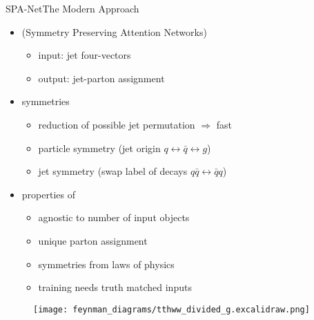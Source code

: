 \documentclass[9pt, aspectratio=169]{beamer}
\begin{document}
\begin{frame}{SPA-Net}{The Modern Approach}
	\begin{minipage}{.58\textwidth}
		\begin{itemize}
			\item \spanet (Symmetry Preserving Attention Networks)
			\begin{itemize}
				\item input: jet four-vectors
				\item output: jet-parton assignment
			\end{itemize}
			\item symmetries
			\begin{itemize}
				\item reduction of possible jet permutation $\Rightarrow$ fast
				\item particle symmetry (jet origin $q\leftrightarrow \bar{q}\leftrightarrow g$)
				\item jet symmetry (swap label of decays $q\bar{q}\leftrightarrow\bar{q}q$)
			\end{itemize}
			\item properties of \spanet
			\begin{itemize}
				\item agnostic to number of input objects
				\item unique parton assignment
				\item symmetries from laws of physics 
				\item training needs truth matched inputs
			\end{itemize}
		\end{itemize}
	  \end{minipage}\hfill
	  \begin{minipage}{.4\textwidth}
		  \begin{figure}
			  \centering
			  \texttt{[image: feynman\_diagrams/tthww\_divided\_g.excalidraw.png]}	
		  \end{figure}
	  \end{minipage}
\end{frame}
\end{document}
